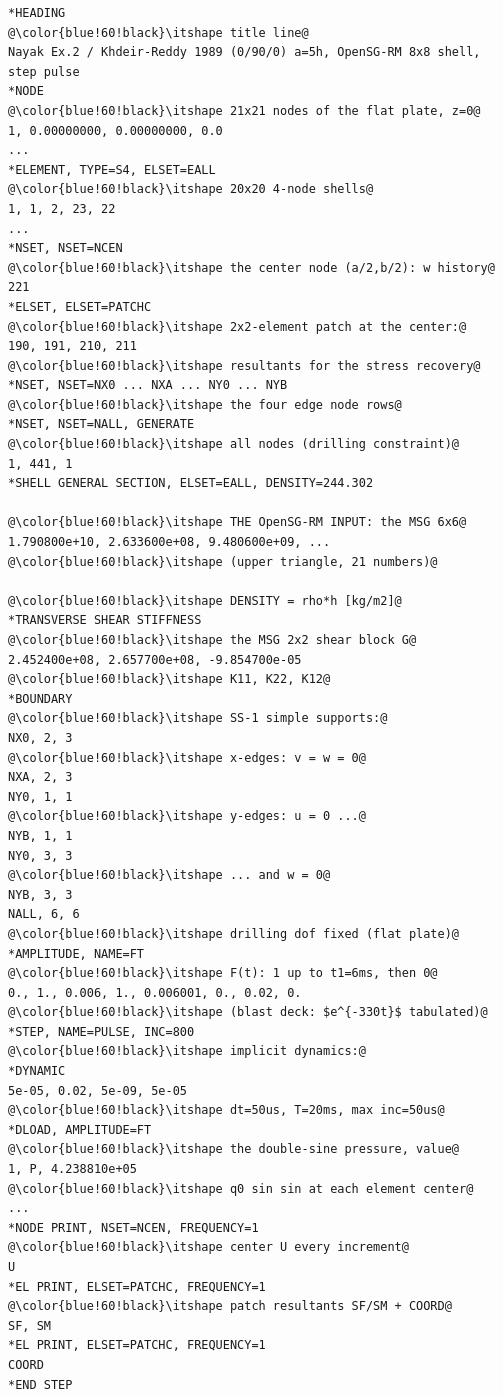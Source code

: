 \documentclass[11pt]{article}
\begin{document}
\begin{lstlisting}[style=deck]
*HEADING                                    @\color{blue!60!black}\itshape title line@
Nayak Ex.2 / Khdeir-Reddy 1989 (0/90/0) a=5h, OpenSG-RM 8x8 shell, step pulse
*NODE                                       @\color{blue!60!black}\itshape 21x21 nodes of the flat plate, z=0@
1, 0.00000000, 0.00000000, 0.0
...
*ELEMENT, TYPE=S4, ELSET=EALL               @\color{blue!60!black}\itshape 20x20 4-node shells@
1, 1, 2, 23, 22
...
*NSET, NSET=NCEN                            @\color{blue!60!black}\itshape the center node (a/2,b/2): w history@
221
*ELSET, ELSET=PATCHC                        @\color{blue!60!black}\itshape 2x2-element patch at the center:@
190, 191, 210, 211                          @\color{blue!60!black}\itshape resultants for the stress recovery@
*NSET, NSET=NX0 ... NXA ... NY0 ... NYB     @\color{blue!60!black}\itshape the four edge node rows@
*NSET, NSET=NALL, GENERATE                  @\color{blue!60!black}\itshape all nodes (drilling constraint)@
1, 441, 1
*SHELL GENERAL SECTION, ELSET=EALL, DENSITY=244.302
                                            @\color{blue!60!black}\itshape THE OpenSG-RM INPUT: the MSG 6x6@
1.790800e+10, 2.633600e+08, 9.480600e+09, ... @\color{blue!60!black}\itshape (upper triangle, 21 numbers)@
                                            @\color{blue!60!black}\itshape DENSITY = rho*h [kg/m2]@
*TRANSVERSE SHEAR STIFFNESS                 @\color{blue!60!black}\itshape the MSG 2x2 shear block G@
2.452400e+08, 2.657700e+08, -9.854700e-05   @\color{blue!60!black}\itshape K11, K22, K12@
*BOUNDARY                                   @\color{blue!60!black}\itshape SS-1 simple supports:@
NX0, 2, 3                                   @\color{blue!60!black}\itshape x-edges: v = w = 0@
NXA, 2, 3
NY0, 1, 1                                   @\color{blue!60!black}\itshape y-edges: u = 0 ...@
NYB, 1, 1
NY0, 3, 3                                   @\color{blue!60!black}\itshape ... and w = 0@
NYB, 3, 3
NALL, 6, 6                                  @\color{blue!60!black}\itshape drilling dof fixed (flat plate)@
*AMPLITUDE, NAME=FT                         @\color{blue!60!black}\itshape F(t): 1 up to t1=6ms, then 0@
0., 1., 0.006, 1., 0.006001, 0., 0.02, 0.   @\color{blue!60!black}\itshape (blast deck: $e^{-330t}$ tabulated)@
*STEP, NAME=PULSE, INC=800                  @\color{blue!60!black}\itshape implicit dynamics:@
*DYNAMIC
5e-05, 0.02, 5e-09, 5e-05                   @\color{blue!60!black}\itshape dt=50us, T=20ms, max inc=50us@
*DLOAD, AMPLITUDE=FT                        @\color{blue!60!black}\itshape the double-sine pressure, value@
1, P, 4.238810e+05                          @\color{blue!60!black}\itshape q0 sin sin at each element center@
...
*NODE PRINT, NSET=NCEN, FREQUENCY=1         @\color{blue!60!black}\itshape center U every increment@
U
*EL PRINT, ELSET=PATCHC, FREQUENCY=1        @\color{blue!60!black}\itshape patch resultants SF/SM + COORD@
SF, SM
*EL PRINT, ELSET=PATCHC, FREQUENCY=1
COORD
*END STEP
\end{lstlisting}
\end{document}
